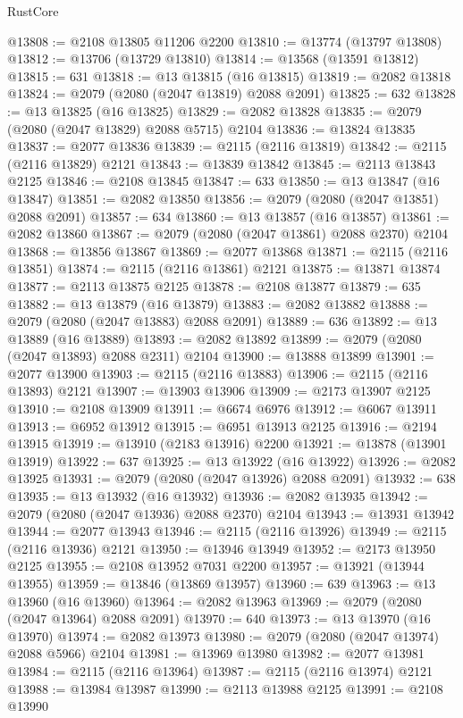 \begin{lexlean}{RustCore}
\begin{coremodule}
@13808 := @2108 @13805 @11206 @2200
@13810 := @13774 (@13797 @13808)
@13812 := @13706 (@13729 @13810)
@13814 := @13568 (@13591 @13812)
@13815 := 631
@13818 := @13 @13815 (@16 @13815)
@13819 := @2082 @13818
@13824 := @2079 (@2080 (@2047 @13819) @2088 @2091)
@13825 := 632
@13828 := @13 @13825 (@16 @13825)
@13829 := @2082 @13828
@13835 := @2079 (@2080 (@2047 @13829) @2088 @5715) @2104
@13836 := @13824 @13835
@13837 := @2077 @13836
@13839 := @2115 (@2116 @13819)
@13842 := @2115 (@2116 @13829) @2121
@13843 := @13839 @13842
@13845 := @2113 @13843 @2125
@13846 := @2108 @13845
@13847 := 633
@13850 := @13 @13847 (@16 @13847)
@13851 := @2082 @13850
@13856 := @2079 (@2080 (@2047 @13851) @2088 @2091)
@13857 := 634
@13860 := @13 @13857 (@16 @13857)
@13861 := @2082 @13860
@13867 := @2079 (@2080 (@2047 @13861) @2088 @2370) @2104
@13868 := @13856 @13867
@13869 := @2077 @13868
@13871 := @2115 (@2116 @13851)
@13874 := @2115 (@2116 @13861) @2121
@13875 := @13871 @13874
@13877 := @2113 @13875 @2125
@13878 := @2108 @13877
@13879 := 635
@13882 := @13 @13879 (@16 @13879)
@13883 := @2082 @13882
@13888 := @2079 (@2080 (@2047 @13883) @2088 @2091)
@13889 := 636
@13892 := @13 @13889 (@16 @13889)
@13893 := @2082 @13892
@13899 := @2079 (@2080 (@2047 @13893) @2088 @2311) @2104
@13900 := @13888 @13899
@13901 := @2077 @13900
@13903 := @2115 (@2116 @13883)
@13906 := @2115 (@2116 @13893) @2121
@13907 := @13903 @13906
@13909 := @2173 @13907 @2125
@13910 := @2108 @13909
@13911 := @6674 @6976
@13912 := @6067 @13911
@13913 := @6952 @13912
@13915 := @6951 @13913 @2125
@13916 := @2194 @13915
@13919 := @13910 (@2183 @13916) @2200
@13921 := @13878 (@13901 @13919)
@13922 := 637
@13925 := @13 @13922 (@16 @13922)
@13926 := @2082 @13925
@13931 := @2079 (@2080 (@2047 @13926) @2088 @2091)
@13932 := 638
@13935 := @13 @13932 (@16 @13932)
@13936 := @2082 @13935
@13942 := @2079 (@2080 (@2047 @13936) @2088 @2370) @2104
@13943 := @13931 @13942
@13944 := @2077 @13943
@13946 := @2115 (@2116 @13926)
@13949 := @2115 (@2116 @13936) @2121
@13950 := @13946 @13949
@13952 := @2173 @13950 @2125
@13955 := @2108 @13952 @7031 @2200
@13957 := @13921 (@13944 @13955)
@13959 := @13846 (@13869 @13957)
@13960 := 639
@13963 := @13 @13960 (@16 @13960)
@13964 := @2082 @13963
@13969 := @2079 (@2080 (@2047 @13964) @2088 @2091)
@13970 := 640
@13973 := @13 @13970 (@16 @13970)
@13974 := @2082 @13973
@13980 := @2079 (@2080 (@2047 @13974) @2088 @5966) @2104
@13981 := @13969 @13980
@13982 := @2077 @13981
@13984 := @2115 (@2116 @13964)
@13987 := @2115 (@2116 @13974) @2121
@13988 := @13984 @13987
@13990 := @2113 @13988 @2125
@13991 := @2108 @13990

\end{coremodule}
\end{lexlean}
